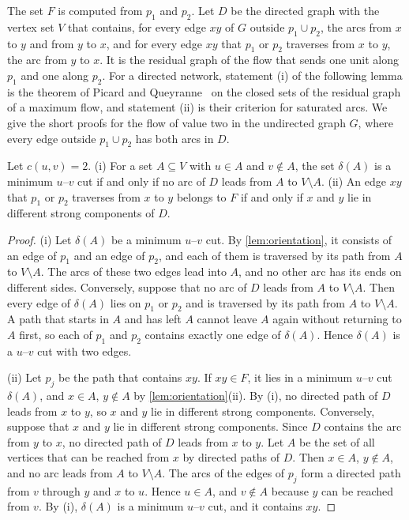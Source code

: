 The set $F$ is computed from $p_1$ and $p_2$.
Let $D$ be the directed graph with the vertex set $V$ that contains, for every edge $xy$ of $G$ outside $p_1 \cup p_2$, the arcs from $x$ to $y$ and from $y$ to $x$, and for every edge $xy$ that $p_1$ or $p_2$ traverses from $x$ to $y$, the arc from $y$ to $x$.
It is the residual graph of the flow that sends one unit along $p_1$ and one along $p_2$.
For a directed network, statement (i) of the following lemma is the theorem of Picard and Queyranne~\cite{PicardQueyranne1980} on the closed sets of the residual graph of a maximum flow, and statement (ii) is their criterion for saturated arcs.
We give the short proofs for the flow of value two in the undirected graph $G$, where every edge outside $p_1 \cup p_2$ has both arcs in $D$.

\begin{lemma}
\label{lem:residual}
Let $c(u, v) = 2$.
(i) For a set $A \subseteq V$ with $u \in A$ and $v \notin A$, the set $\delta(A)$ is a minimum $u$--$v$ cut if and only if no arc of $D$ leads from $A$ to $V \setminus A$.
(ii) An edge $xy$ that $p_1$ or $p_2$ traverses from $x$ to $y$ belongs to $F$ if and only if $x$ and $y$ lie in different strong components of $D$.
\end{lemma}

\begin{proof}
(i) Let $\delta(A)$ be a minimum $u$--$v$ cut.
By \cref{lem:orientation}, it consists of an edge of $p_1$ and an edge of $p_2$, and each of them is traversed by its path from $A$ to $V \setminus A$.
The arcs of these two edges lead into $A$, and no other arc has its ends on different sides.
Conversely, suppose that no arc of $D$ leads from $A$ to $V \setminus A$.
Then every edge of $\delta(A)$ lies on $p_1$ or $p_2$ and is traversed by its path from $A$ to $V \setminus A$.
A path that starts in $A$ and has left $A$ cannot leave $A$ again without returning to $A$ first, so each of $p_1$ and $p_2$ contains exactly one edge of $\delta(A)$.
Hence $\delta(A)$ is a $u$--$v$ cut with two edges.

(ii) Let $p_j$ be the path that contains $xy$.
If $xy \in F$, it lies in a minimum $u$--$v$ cut $\delta(A)$, and $x \in A$, $y \notin A$ by \cref{lem:orientation}(ii).
By (i), no directed path of $D$ leads from $x$ to $y$, so $x$ and $y$ lie in different strong components.
Conversely, suppose that $x$ and $y$ lie in different strong components.
Since $D$ contains the arc from $y$ to $x$, no directed path of $D$ leads from $x$ to $y$.
Let $A$ be the set of all vertices that can be reached from $x$ by directed paths of $D$.
Then $x \in A$, $y \notin A$, and no arc leads from $A$ to $V \setminus A$.
The arcs of the edges of $p_j$ form a directed path from $v$ through $y$ and $x$ to $u$.
Hence $u \in A$, and $v \notin A$ because $y$ can be reached from $v$.
By (i), $\delta(A)$ is a minimum $u$--$v$ cut, and it contains $xy$.
\end{proof}

